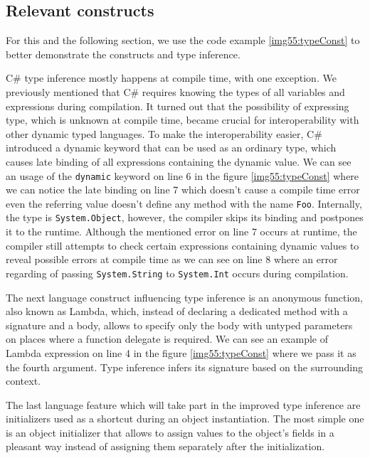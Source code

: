 \subsection{Relevant constructs}

For this and the following section, we use the code example \ref{img55:typeConst} to better demonstrate the constructs and type inference.
\par
{}
C\# type inference mostly happens at compile time, with one exception. 
We previously mentioned that C\# requires knowing the types of all variables and expressions during compilation. 
It turned out that the possibility of expressing type, which is unknown at compile time, became crucial for interoperability with other dynamic typed languages. 
To make the interoperability easier, C\# introduced a dynamic keyword that can be used as an ordinary type, which causes late binding of all expressions containing the dynamic value.
We can see an usage of the \texttt{dynamic} keyword on line 6 in the figure \ref{img55:typeConst} where we can notice the late binding on line 7 which doesn't cause a compile time error even the referring value doesn't define any method with the name \texttt{Foo}.
Internally, the type is \texttt{System.Object}, however, the compiler skips its binding and postpones it to the runtime.
Although the mentioned error on line 7 occurs at runtime, the compiler still attempts to check certain expressions containing dynamic values to reveal possible errors at compile time as we can see on line 8 where an error regarding of passing \texttt{System.String} to \texttt{System.Int} occurs during compilation.
\par
{}
The next language construct influencing type inference is an anonymous function, also known as Lambda, which, instead of declaring a dedicated method with a signature and a body, allows to specify only the body with untyped parameters on places where a function delegate is required.
We can see an example of Lambda expression on line 4 in the figure \ref{img55:typeConst} where we pass it as the fourth argument. 
Type inference infers its signature based on the surrounding context.
\par
{}
The last language feature which will take part in the improved type inference are initializers used as a shortcut during an object instantiation.
The most simple one is an object initializer that allows to assign values to the object's fields in a pleasant way instead of assigning them separately after the initialization.
